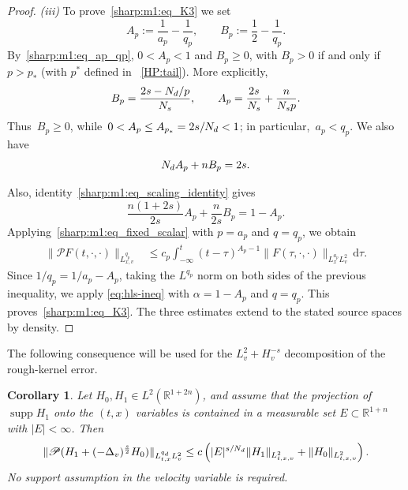 \documentclass[leqno,10pt]{amsart}
\theoremstyle{plain}
\newtheorem{cor}{Corollary}[section]
\theoremstyle{remark}
\numberwithin{equation}{section}
\def\er{\mathbb{R}}
\begin{document}
{\begin{proof}
\noindent
{\it (iii)} To prove~\eqref{sharp:m1:eq_K3} we set
\begin{equation}
\label{sharp:m1:eq_Ap_Bp}
A_p:=\frac1{a_p}-\frac1{q_p},
\qquad
B_p:=\frac12-\frac1{q_p}.
\end{equation}
By~\eqref{sharp:m1:eq_ap_qp}, $0<A_p<1$ and $B_p\geq0$, with $B_p>0$ if and only if $p>p_*$ (with $p^*$ defined in ~\eqref{HP:tail}). 
More explicitly,
\[
B_p=\frac{2s-N_{\rm d}/p}{N_s},
\qquad
A_p=\frac{2s}{N_s}+\frac{n}{N_sp}.
\]
Thus~$B_p\geq0$, while~$0<A_p\leq A_{p_*}=2s/N_{\rm d}<1$; in particular,~$a_p<q_p$. We also have
\begin{equation}
\label{sharp:m1:eq_scaling_identity}
N_{\rm d} A_p+nB_p=2s.
\end{equation}

Also, identity~\eqref{sharp:m1:eq_scaling_identity} gives
\begin{equation}
\label{sharp:m1:eq_beta_identity}
\frac{n(1+2s)}{2s}A_p+\frac n{2s}B_p
=1-A_p.
\end{equation}
Applying~\eqref{sharp:m1:eq_fixed_scalar} with $p=a_p$ and $q=q_p$, we obtain
\begin{align*}
\|\mathscr PF(t,\cdot,\cdot)\|_{L^{q_p}_{x,v}}
&\leq
c_p\int_{-\infty}^t
(t-\tau)^{A_p-1}
\|F(\tau,\cdot,\cdot)\|_{L^{a_p}_xL^2_v}
\,\mathrm d\tau.
\end{align*}
Since $1/q_p=1/a_p-A_p$, taking the $L^{q_p}$ norm on both sides of the previous inequality, we apply \eqref{eq:hls-ineq} with $\alpha = 1-A_p$
and $q=q_p$. This proves~\eqref{sharp:m1:eq_K3}.
The three estimates extend to the stated source spaces by density.
\end{proof}


The following consequence will be used for the $L^2_v+H^{-s}_v$ decomposition of the rough-kernel error.

\begin{cor}
\label{sharp:m1:cor_rough}
Let $H_0,H_1\in L^2(\er^{1+2n})$, and assume that the projection of $\operatorname{supp}H_1$ onto the $(t,x)$ variables is contained in a measurable set $E\subset\er^{1+n}$ with $|E|<\infty$. Then
\begin{equation}
\label{sharp:m1:eq_rough_pair}
\|\mathscr P(H_1+(-\Delta_v)^\frac{s}{2}H_0)\|_{L^{q_{\rm d}}_{t,x}L^2_v}
\leq c\left(|E|^{s/N_{\rm d}}\|H_1\|_{L^2_{t,x,v}}+\|H_0\|_{L^2_{t,x,v}}\right).
\end{equation}
No support assumption in the velocity variable is required.
\end{cor}

}
\end{document}

